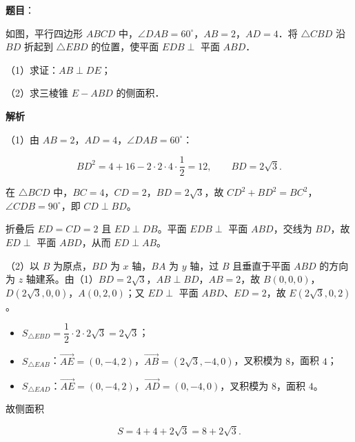 \begin{answer}

\textbf{题目}：

如图，平行四边形 $ABCD$ 中，$\angle DAB=60^\circ$，$AB=2$，$AD=4$．将 $\triangle CBD$ 沿 $BD$ 折起到 $\triangle EBD$ 的位置，使平面 $EDB\perp$ 平面 $ABD$．

（1）求证：$AB\perp DE$；

（2）求三棱锥 $E-ABD$ 的侧面积．
\nopagebreak[4]
\begin{center}\end{center}
\nopagebreak[4]
\textbf{解析}

（1）由 $AB=2$，$AD=4$，$\angle DAB=60^\circ$：

\nopagebreak[4]
\[BD^2=4+16-2\cdot2\cdot4\cdot\frac12=12,\qquad BD=2\sqrt3.\]

在 $\triangle BCD$ 中，$BC=4$，$CD=2$，$BD=2\sqrt3$，故 $CD^2+BD^2=BC^2$，$\angle CDB=90^\circ$，即 $CD\perp BD$。

折叠后 $ED=CD=2$ 且 $ED\perp DB$。平面 $EDB\perp$ 平面 $ABD$，交线为 $BD$，故 $ED\perp$ 平面 $ABD$，从而 $ED\perp AB$。

（2）以 $B$ 为原点，$BD$ 为 $x$ 轴，$BA$ 为 $y$ 轴，过 $B$ 且垂直于平面 $ABD$ 的方向为 $z$ 轴建系。由（1）$BD=2\sqrt3$，$AB\perp BD$，$AB=2$，故 $B(0,0,0)$，$D(2\sqrt3,0,0)$，$A(0,2,0)$；又 $ED\perp$ 平面 $ABD$、$ED=2$，故 $E(2\sqrt3,0,2)$。

\begin{itemize}
\item $S_{\triangle EBD}=\dfrac12\cdot2\cdot2\sqrt3=2\sqrt3$；
\item $S_{\triangle EAB}$：$\overrightarrow{AE}=(0,-4,2)$，$\overrightarrow{AB}=(2\sqrt3,-4,0)$，叉积模为 $8$，面积 $4$；
\item $S_{\triangle EAD}$：$\overrightarrow{AE}=(0,-4,2)$，$\overrightarrow{AD}=(0,-4,0)$，叉积模为 $8$，面积 $4$。
\end{itemize}

故侧面积

\nopagebreak[4]
\[S=4+4+2\sqrt3=8+2\sqrt3.\]


\end{answer}
